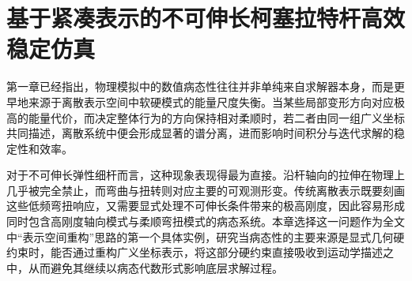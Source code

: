 \chapter{基于紧凑表示的不可伸长柯塞拉特杆高效稳定仿真}

第一章已经指出，物理模拟中的数值病态性往往并非单纯来自求解器本身，而是更早地来源于离散表示空间中软硬模式的能量尺度失衡。当某些局部变形方向对应极高的能量代价，而决定整体行为的方向保持相对柔顺时，若二者由同一组广义坐标共同描述，离散系统中便会形成显著的谱分离，进而影响时间积分与迭代求解的稳定性和效率。

对于不可伸长弹性细杆而言，这种现象表现得最为直接。沿杆轴向的拉伸在物理上几乎被完全禁止，而弯曲与扭转则对应主要的可观测形变。传统离散表示既要刻画这些低频弯扭响应，又需要显式处理不可伸长条件带来的极高刚度，因此容易形成同时包含高刚度轴向模式与柔顺弯扭模式的病态系统。本章选择这一问题作为全文中“表示空间重构”思路的第一个具体实例，研究当病态性的主要来源是显式几何硬约束时，能否通过重构广义坐标表示，将这部分硬约束直接吸收到运动学描述之中，从而避免其继续以病态代数形式影响底层求解过程。


